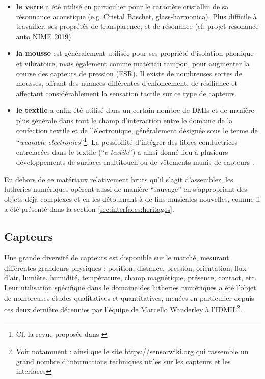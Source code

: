 \begin{itemize}[noitemsep]
	\item \textbf{le verre} a été utilisé en particulier pour le caractère cristallin de sa résonnance acoustique (e.g. Cristal Baschet, glass-harmonica). Plus difficile à travailler, ses proprétés de transparence, et de résonance (cf. projet résonance auto NIME 2019)
	\item \textbf{la mousse} est généralement utilisée pour ses propriété d'isolation phonique et vibratoire, mais également comme matériau tampon, pour augmenter la course des capteurs de pression (\gls{FSR}). Il existe de nombreuses sortes de mousses, offrant des nuances différentes d'enfoncement, de résiliance et affectant considérablement la sensation tactile sur ce type de capteurs.
	\item \textbf{le textile} a enfin été utilisé dans un certain nombre de \glspl{DMI} et de manière plus générale dans tout le champ d'interaction entre le domaine de la confection textile et de l'électronique, généralement désignée sous le terme de ``\textit{wearable electronics}''\footnote{Cf. la revue proposée dans \cite{stoppa_wearable_2014}}. La possibilité d'intégrer des fibres conductrices entrelacées dans le textile (``\textit{e-textile}'') a ainsi donné lieu à plusieurs développements de surfaces multitouch \cite{freed_application_2008, donneaud_designing_2017, wicaksono_fabrickeyboard:_2017} ou de vêtements munis de capteurs \cite{hayafuchi_musicglove_2008, serafin_controlling_2014, myllykoski_prototyping_2015}.
\end{itemize}

\noindent En dehors de ce matériaux relativement bruts qu'il s'agit d'assembler, les lutheries numériques opèrent aussi de manière ``sauvage'' en s'appropriant des objets déjà complexes et en les détournant à de fins musicales nouvelles, comme il a été présenté dans la section \ref{sec:interfaces:heritages}.


\subsection{Capteurs}

\noindent Une grande diversité de capteurs est disponible sur le marché, mesurant différentes grandeurs physiques : position, distance, pression, orientation, flux d'air, lumière, humidité, température, champ magnétique, présence, contact, etc. Leur utilisation spécifique dans le domaine des lutheries numériques a été l'objet de nombreuses études qualitatives et quantitatives, menées en particulier depuis ces deux dernière décennies par l'équipe de Marcello Wanderley à l'\gls{IDMIL}\footnote{Voir notamment : \cite{wanderley_choice_2000, hollinger_evaluation_2006, marshall_sensor_2009, vigliensoni_quantitative_2012, medeiros_comprehensive_2014} ainsi que le site \url{https://sensorwiki.org} qui rassemble un grand nombre d'informations techniques utiles sur les capteurs et les interfaces}.

